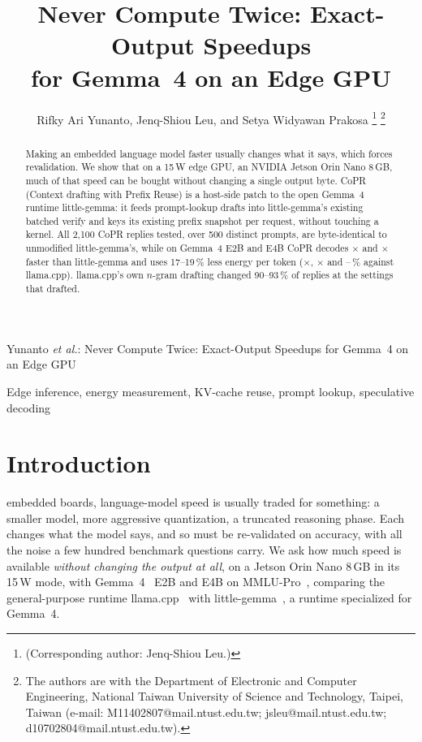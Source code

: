 \documentclass[lettersize,journal]{IEEEtran}
\newcommand{\sys}{CoPR}
\newcommand{\lc}{llama.cpp}
\newcommand{\lgm}{little-gemma}
\begin{document}
\title{Never Compute Twice: Exact-Output Speedups\\for Gemma~4 on an Edge GPU}

\author{Rifky Ari Yunanto, Jenq-Shiou Leu, and Setya Widyawan Prakosa
\thanks{(Corresponding author: Jenq-Shiou Leu.)}
\thanks{The authors are with the Department of Electronic and Computer
Engineering, National Taiwan University of Science and Technology, Taipei,
Taiwan (e-mail: M11402807@mail.ntust.edu.tw; jsleu@mail.ntust.edu.tw;
d10702804@mail.ntust.edu.tw).}}

%
{Yunanto \MakeLowercase{\textit{et al.}}: Never Compute Twice: Exact-Output Speedups for Gemma~4 on an Edge GPU}

\maketitle

\begin{abstract}
Making an embedded language model faster usually changes what it says, which
forces revalidation. We show that on a 15\,W edge GPU, an NVIDIA Jetson Orin Nano
8\,GB, much of that speed can be bought without changing a single output byte.
\sys{} (Context drafting with Prefix Reuse) is a host-side patch to the open
Gemma~4 runtime \lgm{}: it feeds prompt-lookup drafts into \lgm{}'s existing
batched verify and keys its existing prefix snapshot per request, without
touching a kernel. All 2{,}100 \sys{} replies tested, over 500 distinct prompts,
are byte-identical to unmodified \lgm{}'s, while on Gemma~4 E2B and E4B \sys{}
decodes \EtwoSpG$\times$ and \EfourSpG$\times$ faster than \lgm{} and uses
17--19\,\% less energy per token (\EtwoSpL$\times$, \EfourSpL$\times$
and \EtwoJsav--\EfourJsav\,\% against \lc{}). \lc{}'s own $n$-gram drafting
changed 90--93\,\% of replies at the settings that drafted.
\end{abstract}

\begin{IEEEkeywords}
Edge inference, energy measurement, KV-cache reuse, prompt lookup, speculative decoding
\end{IEEEkeywords}

\section{Introduction}
 embedded boards, language-model speed is usually traded for
something: a smaller model, more aggressive quantization, a truncated reasoning
phase. Each changes what the model says, and so must be re-validated on accuracy,
with all the noise a few hundred benchmark questions carry. We ask how much speed
is available \emph{without changing the output at all}, on a Jetson Orin Nano
8\,GB in its 15\,W mode, with Gemma~4~\cite{gemma4} E2B and E4B on
MMLU-Pro~\cite{mmlupro}, comparing the general-purpose runtime \lc{}~\cite{llamacpp}
with \lgm{}~\cite{littlegemma,littlegemmarepo}, a runtime specialized for Gemma~4.
\end{document}
